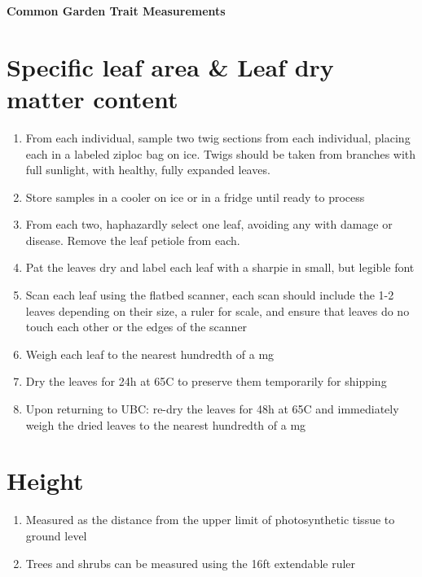 \documentclass[11pt,letter]{article}
\begin{document}
{\bf \Large Common Garden Trait Measurements}\\

\section{Specific leaf area \& Leaf dry matter content}
\begin{enumerate}
\item From each individual, sample two twig sections from each individual, placing each in a labeled ziploc bag on ice. Twigs should be taken from branches with full sunlight, with healthy, fully expanded leaves.
\item Store samples in a cooler on ice or in a fridge until ready to process 
\item From each two, haphazardly select one leaf, avoiding any with damage or disease. Remove the leaf petiole from each.
\item Pat the leaves dry and label each leaf with a sharpie in small, but legible font
\item Scan each leaf using the flatbed scanner, each scan should include the 1-2 leaves depending on their size, a ruler for scale, and ensure that leaves do no touch each other or the edges of the scanner
\item Weigh each leaf to the nearest hundredth of a mg
\item Dry the leaves for 24h at 65C to preserve them temporarily for shipping
\item Upon returning to UBC: re-dry the leaves for 48h at 65C and immediately weigh the dried leaves to the nearest hundredth of a mg
\end{enumerate}

\section{Height}
\begin{enumerate}
\item Measured as the distance from the upper limit of photosynthetic tissue to ground level
\item Trees and shrubs can be measured using the 16ft extendable ruler
\end{enumerate}
\end{document}
